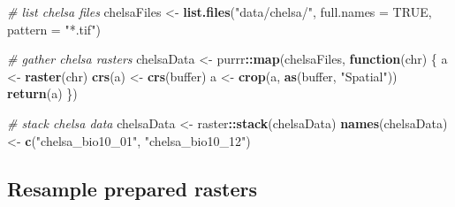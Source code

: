 \documentclass[]{article}
\newenvironment{Shaded}{\begin{snugshade}}{\end{snugshade}}
\newcommand{\CommentTok}[1]{\textcolor[rgb]{0.56,0.35,0.01}{\textit{#1}}}
\newcommand{\ControlFlowTok}[1]{\textcolor[rgb]{0.13,0.29,0.53}{\textbf{#1}}}
\newcommand{\DataTypeTok}[1]{\textcolor[rgb]{0.13,0.29,0.53}{#1}}
\newcommand{\DecValTok}[1]{\textcolor[rgb]{0.00,0.00,0.81}{#1}}
\newcommand{\KeywordTok}[1]{\textcolor[rgb]{0.13,0.29,0.53}{\textbf{#1}}}
\newcommand{\NormalTok}[1]{#1}
\newcommand{\OperatorTok}[1]{\textcolor[rgb]{0.81,0.36,0.00}{\textbf{#1}}}
\newcommand{\OtherTok}[1]{\textcolor[rgb]{0.56,0.35,0.01}{#1}}
\newcommand{\StringTok}[1]{\textcolor[rgb]{0.31,0.60,0.02}{#1}}
\begin{document}
\begin{Shaded}
\begin{Highlighting}[numbers=left,,]
\CommentTok{# list chelsa files}
\NormalTok{chelsaFiles <-}\StringTok{ }\KeywordTok{list.files}\NormalTok{(}\StringTok{"data/chelsa/"}\NormalTok{, }\DataTypeTok{full.names =} \OtherTok{TRUE}\NormalTok{, }\DataTypeTok{pattern =} \StringTok{"*.tif"}\NormalTok{)}

\CommentTok{# gather chelsa rasters}
\NormalTok{chelsaData <-}\StringTok{ }\NormalTok{purrr}\OperatorTok{::}\KeywordTok{map}\NormalTok{(chelsaFiles, }\ControlFlowTok{function}\NormalTok{(chr) \{}
\NormalTok{  a <-}\StringTok{ }\KeywordTok{raster}\NormalTok{(chr)}
  \KeywordTok{crs}\NormalTok{(a) <-}\StringTok{ }\KeywordTok{crs}\NormalTok{(buffer)}
\NormalTok{  a <-}\StringTok{ }\KeywordTok{crop}\NormalTok{(a, }\KeywordTok{as}\NormalTok{(buffer, }\StringTok{"Spatial"}\NormalTok{))}
  \KeywordTok{return}\NormalTok{(a)}
\NormalTok{\})}

\CommentTok{# stack chelsa data}
\NormalTok{chelsaData <-}\StringTok{ }\NormalTok{raster}\OperatorTok{::}\KeywordTok{stack}\NormalTok{(chelsaData)}
\KeywordTok{names}\NormalTok{(chelsaData) <-}\StringTok{ }\KeywordTok{c}\NormalTok{(}\StringTok{"chelsa_bio10_01"}\NormalTok{, }\StringTok{"chelsa_bio10_12"}\NormalTok{)}
\end{Highlighting}
\end{Shaded}

\hypertarget{resample-prepared-rasters}{%
\subsection{Resample prepared rasters}\label{resample-prepared-rasters}}

\begin{Shaded}
\end{Shaded}
\end{document}
